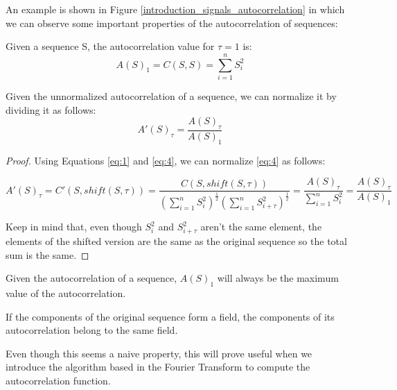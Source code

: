 An example  is shown in Figure
\ref{introduction_signals_autocorrelation} in which we can observe
some important properties of the autocorrelation of sequences:

\begin{theorem}\label{theorem:1.2.1}
  Given a sequence S, the autocorrelation value for $\tau = 1$ is:
    \begin{equation}
      A(S)_{1}=C(S, S)=\sum_{i=1}^{n}S_{i}^2
    \end{equation}
\end{theorem}

\begin{corollary}
  Given the unnormalized autocorrelation of a sequence, we can
  normalize it by dividing it as follows:
  \begin{equation}
    A'(S)_{\tau} = \frac{A(S)_{\tau}}{A(S)_{1}}
  \end{equation}
\end{corollary}

\begin{proof}
  Using Equations \ref{eq:1} and \ref{eq:4}, we can normalize \ref{eq:4} as
  follows:

    $$A'(S)_{\tau} = C'(S, shift(S, \tau)) = \frac{C(S, shift(S, \tau))}{(\sum_{i=1}^{n} S_{i}^{2})^{\frac{1}{2}}(\sum_{i=1}^{n} S_{i+\tau}^{2})^\frac{1}{2}} = \frac{A(S)_{\tau}}{\sum_{i=1}^{n} S_{i}^{2}} = \frac{A(S)_{\tau}}{A(S)_{1}}$$

  Keep in mind that, even though $S_{i}^2$ and $S_{i+\tau}^2$ aren't the same
  element, the elements of the shifted version are the same as the original
  sequence so the total sum is the same.
\end{proof}

\begin{corollary}\label{autocorrelation:coro:1}
  Given the autocorrelation of a sequence, $A(S)_{1}$ will always be the
  maximum value of the autocorrelation.
\end{corollary}

\begin{property}

  If the components of the original sequence form a field, the components of
  its autocorrelation belong to the same field.

\end{property}

Even though this seems a naive property, this will prove
useful when we introduce the algorithm based in the Fourier Transform to
compute the autocorrelation function.









